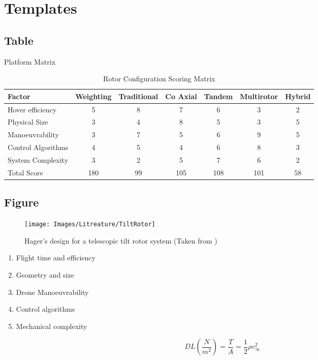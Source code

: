 \chapter{Templates}

\section{Table}
Platform Matrix
\begin{table}[!]
	\centering
	\begin{tabular}{l | c | c | c | c | c | c |}
		Factor & Weighting & Traditional & Co Axial & Tandem & Multirotor & Hybrid\\
		\hline\hline
		Hover efficiency 	   	& 5 & 8 & 7 & 6 & 3 & 2\\
		Physical Size 		    & 3 & 4 & 8 & 5 & 3 & 5\\
		Manoeuvrability 	  	& 3 & 7 & 5 & 6 & 9 & 5\\
		Control Algorithms  	& 4 & 5 & 4 & 6 & 8 & 3\\
		System Complexity 		& 3 & 2 & 5 & 7 & 6 & 2\\
		\hline\hline
		Total Score & 180 & 99 & 105 & 108 & 101 & 58\\
	\end{tabular}
	\label{TAB_PlatformDesign}
	\caption{Rotor Configuration Scoring Matrix}
\end{table}


\section{Figure}
\begin{figure}[H]
\centering
\texttt{[image: Images/Litreature/TiltRotor]}     
\caption{Hager's design for a telescopic tilt rotor system (Taken from \cite{Heli})}
\label{IM_EG}
\end{figure}




\begin{enumerate}
\item Flight time and efficiency
\item Geometry and size
\item Drone Manoeuvrability
\item Control algorithms
\item Mechanical complexity
\end{enumerate}

\begin{equation}
\label{EQ_EG}
DL (\frac{N}{m^{2}})= \frac{T}{A} = \frac{1}{2} \rho v_\infty^2
\end{equation}
